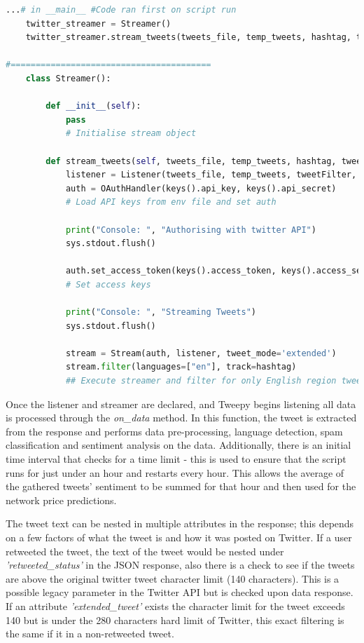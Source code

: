 \documentclass[oneside, 12pt]{article}
\begin{document}
			
			\begin{lstlisting}[language=python, caption=Tweepy Streamer setup]
...# in __main__ #Code ran first on script run
	twitter_streamer = Streamer()
	twitter_streamer.stream_tweets(tweets_file, temp_tweets, hashtag, tweetFilter, analyser)
				
#========================================
	class Streamer():
				
		def __init__(self):
			pass
			# Initialise stream object
				
		def stream_tweets(self, tweets_file, temp_tweets, hashtag, tweetFilter, analyser):
			listener = Listener(tweets_file, temp_tweets, tweetFilter, analyser)
			auth = OAuthHandler(keys().api_key, keys().api_secret)
			# Load API keys from env file and set auth
				
			print("Console: ", "Authorising with twitter API")
			sys.stdout.flush()
				
			auth.set_access_token(keys().access_token, keys().access_secret)
			# Set access keys
						
			print("Console: ", "Streaming Tweets")
			sys.stdout.flush()
				
			stream = Stream(auth, listener, tweet_mode='extended')
			stream.filter(languages=["en"], track=hashtag)
			## Execute streamer and filter for only English region tweets and by specified hashtag ('Bitcoin')
			\end{lstlisting}
			
			Once the listener and streamer are declared, and Tweepy begins listening all data is processed through the \textit{on\_data} method. In this function, the tweet is extracted from the response and performs data pre-processing, language detection, spam classification and sentiment analysis on the data. Additionally, there is an initial time interval that checks for a time limit - this is used to ensure that the script runs for just under an hour and restarts every hour. This allows the average of the gathered tweets' sentiment to be summed for that hour and then used for the network price predictions. 
			
			The tweet text can be nested in multiple attributes in the response; this depends on a few factors of what the tweet is and how it was posted on Twitter. If a user retweeted the tweet, the text of the tweet would be nested under \textit{'retweeted\_status'} in the JSON response, also there is a check to see if the tweets are above the original twitter tweet character limit (140 characters). This is a possible legacy parameter in the Twitter API but is checked upon data response. If an attribute \textit{'extended\_tweet'} exists the character limit for the tweet exceeds 140 but is under the 280 characters hard limit of Twitter, this exact filtering is the same if it in a non-retweeted tweet.
			\newline
			
\end{document}
